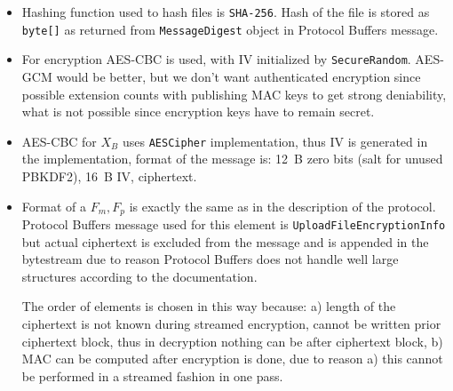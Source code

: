 \documentclass[a4paper,10pt]{article}
\begin{document}
\begin{itemize}
 \item Hashing function used to hash files is \texttt{SHA-256}. Hash of the file is 
	    stored as \texttt{byte[]} as returned from \texttt{MessageDigest} object in Protocol Buffers message. 
  
 \item For encryption AES-CBC is used, with IV initialized by \texttt{SecureRandom}. AES-GCM would be better, 
	but we don't want authenticated encryption since possible extension counts with publishing 
	MAC keys to get strong deniability, what is not possible since encryption keys have to remain secret.
 
 \item AES-CBC for $X_B$ uses \texttt{AESCipher} implementation, thus IV is generated in the implementation, 
    format of the message is: 12~B zero bits (salt for unused PBKDF2), 16~B IV, ciphertext.

 \item Format of a $F_m, F_p$ is exactly the same
    as in the description of the protocol. Protocol Buffers message used for this element is \texttt{UploadFileEncryptionInfo} 
    but actual ciphertext is excluded from the message and is appended in the bytestream due to reason Protocol Buffers 
    does not handle well large structures according to the documentation.
    
    The order of elements is chosen in this way because: a) length of the ciphertext is not known during streamed encryption, 
    cannot be written prior ciphertext block, thus in decryption nothing can be after ciphertext block, b) MAC can be computed
    after encryption is done, due to reason a) this cannot be performed in a streamed fashion in one pass. 


\end{itemize}
\end{document}
